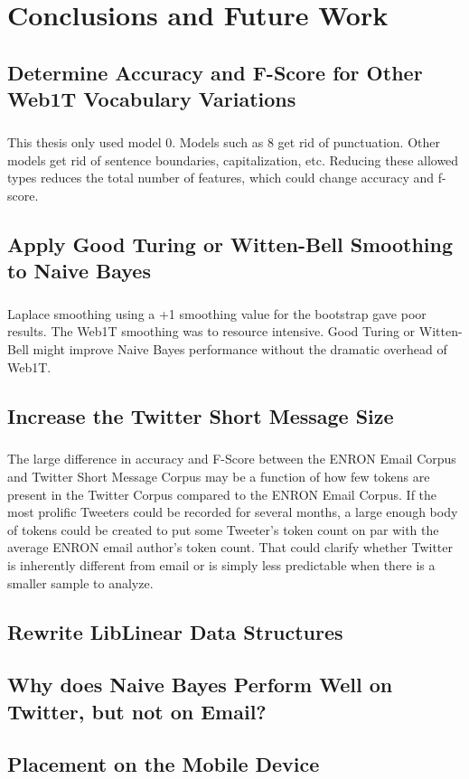 \chapter{Conclusions and Future Work}

\section{Determine Accuracy and F-Score for Other Web1T Vocabulary Variations}
\paragraph{} This thesis only used model 0.  Models such as 8 get rid of punctuation.  Other models get rid of sentence boundaries, capitalization, etc.  Reducing these allowed types reduces the total number of features, which could change accuracy and f-score.

\section{Apply Good Turing or Witten-Bell Smoothing to Naive Bayes}
\paragraph{} Laplace smoothing using a +1 smoothing value for the bootstrap gave poor results.  The Web1T smoothing was to resource intensive.  Good Turing or Witten-Bell might improve Naive Bayes performance without the dramatic overhead of Web1T.

\section{Increase the Twitter Short Message Size}
	\paragraph{} The large difference in accuracy and F-Score between the ENRON Email Corpus and Twitter Short Message Corpus may be a function of how few tokens are present in the Twitter Corpus compared to the ENRON Email Corpus.  If the most prolific Tweeters could be recorded for several months, a large enough body of tokens could be created to put some Tweeter's token count on par with the average ENRON email author's token count.  That could clarify whether Twitter is inherently different from email or is simply less predictable when there is a smaller sample to analyze.

\section{Rewrite LibLinear Data Structures}

\section{Why does Naive Bayes Perform Well on Twitter, but not on Email?}

\section{Placement on the Mobile Device}
\paragraph{} 


